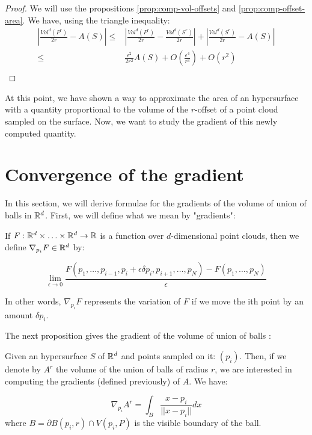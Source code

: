 \begin{proof}
    We will use the propositions \ref{prop:comp-vol-offsets} and
    \ref{prop:comp-offset-area}. We have, using the triangle inequality:
    \begin{align*}
        \left| \frac{Vol^d(P^r)}{2r} - A(S) \right| \leq& \left| \frac{Vol^d(P^r)}{2r} -
            \frac{Vol^d(S^r)}{2r} \right| + \left| \frac{Vol^d(S^r)}{2r} -
            A(S) \right| \\
        \leq& \frac{\epsilon^2}{2r^2} A(S) + O(\frac{\epsilon^4}{r^3}) + O(r^2) \\
    \end{align*}
\end{proof}

At this point, we have shown a way to approximate the area of an hypersurface
with a quantity proportional to the volume of the $r$-offset of a point cloud
sampled on the surface.
Now, we want to study the gradient of this newly computed quantity.

\section{Convergence of the gradient}

In this section, we will derive formulae for the gradients of the volume of
union of balls in $ \mathbb{R}^d $. First, we will define what we mean by "gradients":

\begin{definition}
    If $ F : \mathbb{R}^d \times \ldots \times \mathbb{R}^d \to \mathbb{R} $ is a function over
    $d$-dimensional point clouds, then we define $ \nabla_{p_i} F \in \mathbb{R}^d $ by:

    $$ \lim\limits_{\epsilon \to 0} \frac{F(p_1, \ldots, p_{i-1}, p_i + \epsilon
        \delta p_i, p_{i+1}, \ldots, p_N) - F(p_1, \ldots, p_N)}{\epsilon} $$

    In other words, $ \nabla_{p_i} F $ represents the variation of $ F $ if
    we move the ith point by an amount $ \delta p_i $.
\end{definition}

The next proposition gives the gradient of the volume of union of balls :
\begin{proposition}
    Given an hypersurface $ S $ of $ \mathbb{R}^d $ and points sampled on it: $ (p_i) $.
    Then, if we denote by $ A^r $ the volume of the union of balls of radius $ r
    $, we are interested in computing the gradients (defined previously) of $ A $. We
    have:

    \begin{equation}
        \label{eqn:gradient_area_2d}
        \nabla_{p_i} A^r = \int_{B} \frac{x - p_i}{||x - p_i||} dx
    \end{equation}
    where $ B = \partial B(p_i, r) \cap V(p_i, P) $ is the visible boundary of
    the ball.
\end{proposition}


